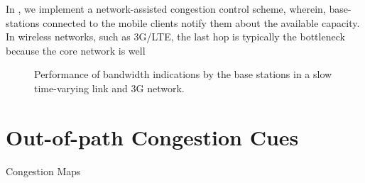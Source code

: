 In , we implement a network-assisted congestion control
scheme, wherein, base-stations connected to the mobile clients notify them
about the available capacity. In wireless networks, such as 3G/LTE, the last
hop is typically the bottleneck because the core network is well 



\begin{figure}
  \centerline{
  }
  \caption{Performance of bandwidth indications by the base stations in a slow
  time-varying link and 3G network.}
  \label{fig:tmmbn}
\end{figure}

\section{Out-of-path Congestion Cues}

Congestion Maps